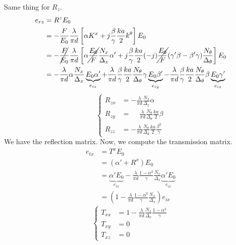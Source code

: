 Same thing for $R_z$.
\begin{align*}
    e_{rz} &= R^z E_0
    \\
    &=
    -
    \frac{F}{E_0}
    \frac{\lambda}{\pi d}
    \left[
        \alpha K^x
        +
        j
        \frac{\beta}{\gamma}
        \frac{ka}{2}
        k^\theta
    \right]
    E_0
    \\
    &=
    -
    \cancel{\frac{F}{E_0}}
    \frac{\lambda}{\pi d}
    \left[
        \alpha
        \cancel{\frac{E_0}{F}}
        \frac{N_x}{\Delta_x}
        \alpha'
        +
        j
        \frac{\beta}{\gamma}
        \frac{ka}{2}
        (-j)
        \cancel{\frac{E_0}{F}}
        (\gamma' \beta - \beta' \gamma)
        \frac{N_\theta}{\Delta_\theta}
    \right]
    E_0
    \\
    &=
    -
    \frac{\lambda}{\pi d}
    \alpha
    \frac{N_x}{\Delta_x}
    \underbrace{E_0 \alpha'}_{e_{ix}}
    +
    \frac{\lambda}{\pi d}
    \frac{\beta}{\gamma}
    \frac{ka}{2}
    \frac{N_\theta}{\Delta_\theta}
    \gamma
    \underbrace{E_0 \beta'}_{e_{iy}}
    -
    \frac{\lambda}{\pi d}
    \frac{\beta}{\gamma}
    \frac{ka}{2}
    \frac{N_\theta}{\Delta_\theta}
    \beta
    \underbrace{E_0 \gamma'}_{e_{iz}}
\end{align*}
\begin{equation}
    \left\lbrace
    \begin{aligned}
        R_{zx}
        &=
        -
        \frac{\lambda}{\pi d}
        \frac{N_x}{\Delta_x}
        \alpha
        \\
        R_{zy}
        &=
        \phantom{-}
        \frac{\lambda}{\pi d}
        \frac{N_\theta}{\Delta_\theta}
        \frac{ka}{2}
        \beta
        \\
        R_{zz}
        &=
        -
        \frac{\lambda}{\pi d}
        \frac{N_\theta}{\Delta_\theta}
        \frac{ka}{2}
        \frac{\beta^2}{\gamma}
    \end{aligned}
    \right.
\end{equation}
We have the reflection matrix.
Now, we compute the transmission matrix.
\begin{align*}
    e_{tx} &= T^x E_0
    \\
    &= (\alpha' + R^x) E_0
    \\
    &= \underbrace{\alpha' E_0}_{e_{ix}}
       -
       \frac{\lambda}{\pi d}
       \frac{1 - \alpha^2}{\gamma}
       \frac{N_x}{\Delta_x}
       \underbrace{\alpha' E_0}_{e_{ix}}
    \\
    &= \left(
           1
           -
           \frac{\lambda}{\pi d}
           \frac{1 - \alpha^2}{\gamma}
           \frac{N_x}{\Delta_x}
       \right)
       e_{ix}
\end{align*}
\begin{equation}
    \left\lbrace
    \begin{aligned}
        T_{xx}
        &= 1
           -
           \frac{\lambda}{\pi d}
           \frac{N_x}{\Delta_x}
           \frac{1 - \alpha^2}{\gamma}
        \\
        T_{xy} &= 0
        \\
        T_{xz} &= 0
    \end{aligned}
    \right.
\end{equation}

